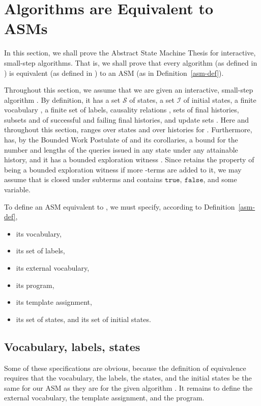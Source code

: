 \documentclass{LMCS}
\theoremstyle{definition}
\newcommand{\scr}[1]{\ensuremath{\mathcal {#1}}}
\newcommand{\ttt}[1]{\ensuremath{\mathtt {#1}}}
\begin{document}
\section{Algorithms are Equivalent to ASMs}   \label{sec:thesis}

In this section, we shall prove the Abstract State Machine Thesis for
interactive, small-step algorithms.  That is, we shall prove that
every algorithm (as defined in \cite[Section~3]{ga1}) is equivalent
(as defined in \cite[Section~4]{ga1}) to an ASM (as in
Definition~\ref{asm-def}).

Throughout this section, we assume that we are given an interactive,
small-step algorithm .  By definition, it has a set \scr S of
states, a set \scr I of initial states, a finite vocabulary
, a finite set  of labels, causality relations
, sets  of final histories, subsets 
and  of successful and failing final histories, and
update sets .  Here and throughout this section, 
ranges over states and  over histories for .  Furthermore,
 has, by the Bounded Work Postulate of \cite{ga1} and its
corollaries, a bound  for the number and lengths of the queries
issued in any state under any attainable history, and it has a
bounded exploration witness . Since  retains the property of
being a bounded exploration witness if more -terms are
added to it, we may assume that  is closed under subterms and
contains \ttt{true,\ false}, and some variable.

To define an ASM equivalent to , we must specify, according to
Definition~\ref{asm-def},
\begin{itemize}
\item its vocabulary,
\item its set of labels,
\item its external vocabulary,
\item its program,
\item its template assignment,
\item its set of states, and its set of initial states.
\end{itemize}

\subsection{Vocabulary, labels, states}

Some of these specifications are obvious, because the definition of
equivalence requires that the vocabulary, the labels, the states, and
the initial states be the same for our ASM as they are for the given
algorithm . It remains to define the external vocabulary, the
template assignment, and the program.
\end{document}
